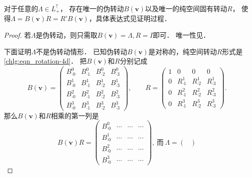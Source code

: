 \begin{theorem} \label{chlg:thm_lorentz-decompose-r}
    对于任意的$ \Lambda \in L^{\uparrow}_{+}$，
    存在唯一的伪转动$B(\boldsymbol{v})$以及唯一的纯空间固有转动$R$，
    使得$\Lambda = B(\boldsymbol{v}) R = R'B(\boldsymbol{v})$，具体表达式见证明过程．
\end{theorem}
\begin{proof}
    若$\Lambda$是伪转动，则只需取$B(\boldsymbol{v})=\Lambda,R=I$即可．
    唯一性见．
    
    下面证明$\Lambda$不是伪转动情形．
    已知伪转动$B(\boldsymbol{v})$是对称的，纯空间转动$R$形式是\eqref{chlg:eqn_rotation-4d}．
    把$B(\boldsymbol{v})$和$R$分别记成
    \begin{equation}
        B(\boldsymbol{v}) = \begin{pmatrix}
            B^0_{\cdot 0}  & B^0_{\cdot 1} & B^0_{\cdot 2} & B^0_{\cdot 3} \\
            B^1_{\cdot 0}  & B^1_{\cdot 1} & B^1_{\cdot 2} & B^1_{\cdot 3} \\
            B^2_{\cdot 0}  & B^2_{\cdot 1} & B^2_{\cdot 2} & B^2_{\cdot 3} \\
            B^3_{\cdot 0}  & B^3_{\cdot 1} & B^3_{\cdot 2} & B^3_{\cdot 3}
        \end{pmatrix}, \qquad
        R = \begin{pmatrix}
            1    & 0 & 0 & 0 \\
            0 & R^1_{\cdot 1} & R^1_{\cdot 2} & R^1_{\cdot 3} \\
            0 & R^2_{\cdot 1} & R^2_{\cdot 2} & R^2_{\cdot 3} \\
            0 & R^3_{\cdot 1} & R^3_{\cdot 2} & R^3_{\cdot 3}
        \end{pmatrix}.
    \end{equation}
    那么$B(\boldsymbol{v})$和$R$相乘的第一列是
    \begin{equation}\label{chlg:eqn_ld-tmp1}
        B(\boldsymbol{v})R=\begin{pmatrix}
            B^0_{\cdot 0} & \cdots & \cdots& \cdots\\
            B^1_{\cdot 0} & \cdots & \cdots& \cdots\\
            B^2_{\cdot 0} & \cdots & \cdots& \cdots\\
            B^3_{\cdot 0} & \cdots & \cdots& \cdots
        \end{pmatrix},\ \text{而}\
        \Lambda=\begin{pmatrix}

\end{pmatrix}
\end{equation}
\end{proof}
